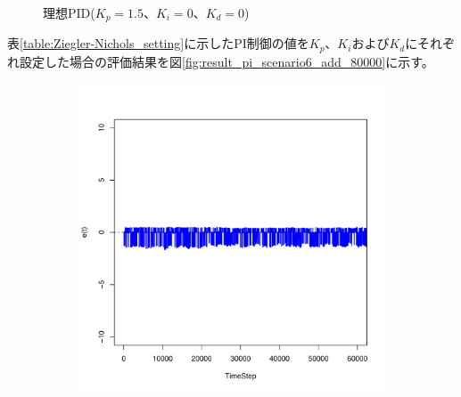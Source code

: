 \documentclass[a4j]{ujarticle}
\begin{document}
\begin{figure}[htbp]
\begin{subfigure}{0.49\hsize}
   \label{subfig:scenario_6_stateBreakdown_345600_691200_1-5_0_0_0_ideal_add_80000}
 \end{subfigure}
 \caption{理想PID($K_p = 1.5、K_i = 0、K_d = 0$)}
 \label{fig:result_p_scenario6_add_80000}
\end{figure}
\clearpage
表\ref{table:Ziegler-Nichols_setting}に示したPI制御の値を$K_p$、$K_i$および$K_d$にそれぞれ設定した場合の評価結果を図\ref{fig:result_pi_scenario6_add_80000}に示す。
\begin{figure}[htbp]
 \centering
 \begin{subfigure}{0.49\hsize}
   \centering
   \includegraphics[width=1.0\hsize]{scenario_6_e_345600_691200_1-35_0-000203_0_0_ideal_add_80000.pdf}
   \label{subfig:scenario_6_e_345600_691200_1-35_0-000203_0_0_ideal_add_80000}
 \end{subfigure}
 \begin{subfigure}{0.49\hsize}
   \centering

\end{subfigure}
\end{figure}
\end{document}
